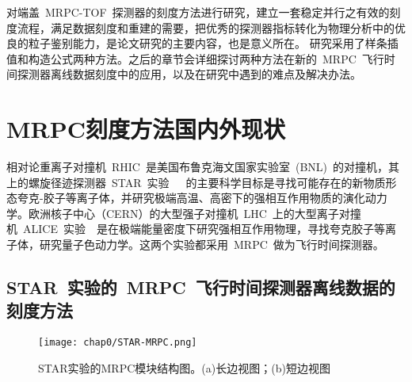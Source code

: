 对端盖~MRPC-TOF~探测器的刻度方法进行研究，建立一套稳定并行之有效的刻度流程，满足数据刻度和重建的需要，把优秀的探测器指标转化为物理分析中的优良的粒子鉴别能力，是论文研究的主要内容，也是意义所在。
研究采用了样条插值和构造公式两种方法。之后的章节会详细探讨两种方法在新的~MRPC~飞行时间探测器离线数据刻度中的应用，以及在研究中遇到的难点及解决办法。

\section{MRPC刻度方法国内外现状}

相对论重离子对撞机~RHIC~是美国布鲁克海文国家实验室~(BNL)~的对撞机，其上的螺旋径迹探测器~STAR~实验~\cite{ruanlj:2005}~\cite{wuj:2005}~\cite{wangy:2010}的主要科学目标是寻找可能存在的新物质形态夸克-胶子等离子体，并研究极端高温、高密下的强相互作用物质的演化动力学。欧洲核子中心（CERN）的大型强子对撞机~LHC~上的大型离子对撞机~ALICE~实验~\cite{A.Alici:2012}~\cite{A.Alici:2014}是在极端能量密度下研究强相互作用物理，寻找夸克胶子等离子体，研究量子色动力学。这两个实验都采用~MRPC~做为飞行时间探测器。

\begin{comment}
~STAR~的~TOF~由~3840~块~MRPC~组成，每块有~6~个读数条。刻度样本选择的是动量在~0.3—0.6Gev/c~的~$\pi$~介子。由于信号在读出条内的反射，每个电子学读出通道的~TOT~（time-over-threshold~\cite{Shao:2009aa}，简称TOT）分布存在多峰，且各不相同，时幅修正的刻度采用样条拟合（spline-fit）的方法。信号在读出条上的传输时间依赖信号传播距离，击中位置的修正只考虑沿读出条方向的效应。扣除起始时间晃动~55~ps后，时间分辨为~75~ps~\cite{Shao:2009aa}。

~ALICE~的~TOF~由~1593~块~MRPC~组成，每块面积为~7.4~cm$\times$~120~cm，每个模块~96~个读出端，每个读出端面积为~2.5~cm$\times$~3.5~cm。刻度样本需要完整的径迹重建。TOF~刻度分为三个步骤：（1）一个整体的偏移；（2）每个电子学通道的偏移；（3）每个电子学通道的时幅修正。时幅修正采用的是~TOT~的~5~阶多项式拟合。扣除事例起始时间的影响后，时间分辨为~80~ps~\cite{A.A:2005}。
\end{comment}

\subsection{STAR~实验的~MRPC~飞行时间探测器离线数据的刻度方法}
\begin{figure}[!h]
  \centering
  \texttt{[image: chap0/STAR-MRPC.png]}
  \caption{STAR实验的MRPC模块结构图。(a)长边视图；(b)短边视图}
  \label{fig:STAR-MRPC}
\end{figure}

